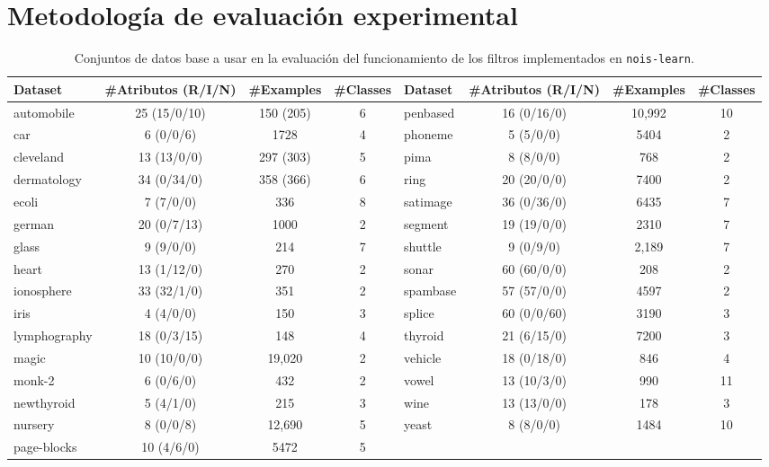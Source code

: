 \documentclass[print, color]{ugrTFG}
\begin{document}
\chapter{Metodología de evaluación experimental} \label{sect:metodología}

    \begin{table}[b!]
        \footnotesize
        \caption{Conjuntos de datos base a usar en la evaluación del funcionamiento de los filtros implementados en \texttt{nois-learn}.}
        \label{tab:base-datasets}
        \hspace{-0.75cm}
        \begin{tabular}{lccc lccc}
        \toprule
        Dataset & \#Atributos (R/I/N) & \#Examples & \#Classes &
        Dataset & \#Atributos (R/I/N) & \#Examples & \#Classes \\
        \midrule
        automobile    & 25 (15/0/10) & 150 (205) & 6  & penbased  & 16 (0/16/0)  & 10,992 & 10 \\
        car           & 6 (0/0/6)    & 1728      & 4  & phoneme   & 5 (5/0/0)    & 5404   & 2  \\
        cleveland     & 13 (13/0/0)  & 297 (303) & 5  & pima      & 8 (8/0/0)    & 768    & 2  \\
        dermatology   & 34 (0/34/0)  & 358 (366) & 6  & ring      & 20 (20/0/0)  & 7400   & 2  \\
        ecoli         & 7 (7/0/0)    & 336       & 8  & satimage  & 36 (0/36/0)  & 6435   & 7  \\
        german        & 20 (0/7/13)  & 1000      & 2  & segment   & 19 (19/0/0)  & 2310   & 7  \\
        glass         & 9 (9/0/0)    & 214       & 7  & shuttle   & 9 (0/9/0)    & 2,189 & 7  \\
        heart         & 13 (1/12/0)  & 270       & 2  & sonar     & 60 (60/0/0)  & 208    & 2  \\
        ionosphere    & 33 (32/1/0)  & 351       & 2  & spambase  & 57 (57/0/0)  & 4597   & 2  \\
        iris          & 4 (4/0/0)    & 150       & 3  & splice    & 60 (0/0/60)  & 3190   & 3  \\
        lymphography  & 18 (0/3/15)  & 148       & 4  & thyroid   & 21 (6/15/0)  & 7200   & 3  \\
        magic         & 10 (10/0/0)  & 19,020    & 2  & vehicle   & 18 (0/18/0)  & 846    & 4  \\
        monk-2        & 6 (0/6/0)    & 432       & 2  & vowel     & 13 (10/3/0)  & 990    & 11 \\
        newthyroid    & 5 (4/1/0)    & 215       & 3  & wine      & 13 (13/0/0)  & 178    & 3  \\
        nursery       & 8 (0/0/8)    & 12,690    & 5  & yeast     & 8 (8/0/0)    & 1484   & 10 \\
        page-blocks   & 10 (4/6/0)   & 5472      & 5  &           &              &        &    \\
        \bottomrule
        \end{tabular}
    \end{table}
\end{document}
